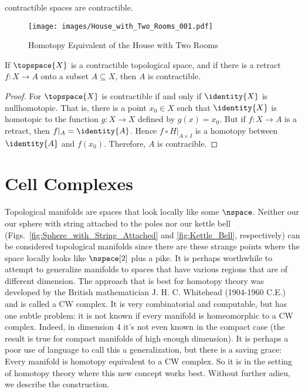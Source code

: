\documentclass{book}                                                           %
\begin{document}
                contractible spaces are contractible.
                \begin{figure}
                    \centering
                    \captionsetup{type=figure}
                    \texttt{[image: images/House\_with\_Two\_Rooms\_001.pdf]}
                    \caption{Homotopy Equivalent of the House with Two Rooms}
                    \label{fig:House_with_Two_Rooms_001}
                \end{figure}
                \begin{theorem}
                    If $\topspace{X}$ is a contractible topological space, and
                    if there is a retract $f:X\rightarrow{A}$ onto a subset
                    $A\subseteq{X}$, then $A$ is contractible.
                \end{theorem}
                \begin{proof}
                    For $\topspace{X}$ is contractible if and only if
                    $\identity{X}$ is nullhomotopic. That is, there is a point
                    $x_{0}\in{X}$ such that $\identity{X}$ is homotopic to the
                    function $g:X\rightarrow{X}$ defined by $g(x)=x_{0}$. But if
                    $f:X\rightarrow{A}$ is a retract, then
                    $f|_{A}=\identity{A}$. Hence $f\circ{H}|_{A\times{I}}$ is a
                    homotopy between $\identity{A}$ and $f(x_{0})$. Therefore,
                    $A$ is contracible.
                \end{proof}
        \section{Cell Complexes}
            Topological manifolds are spaces that look locally like some
            $\nspace$. Neither our our sphere with string attached to the poles
            nor our kettle bell (Figs.~\ref{fig:Sphere_with_String_Attached} and
            \ref{fig:Kettle_Bell}, respectively) can be considered topological
            manifolds since there are these strange points where the space
            locally looks like $\nspace[2]$ plus a pike. It is perhaps
            worthwhile to attempt to generalize manifolds to spaces that have
            various regions that are of different dimension. The approach that
            is best for homotopy theory was developed by the British
            mathematician J. H. C. Whitehead (1904-1960 C.E.) and is called a
            CW complex. It is very combinatorial and computable, but has one
            subtle problem: it is not known if every manifold is homeomorphic to
            a CW complex. Indeed, in dimension 4 it's not even known in the
            compact case (the result is true for compact manifolds of high
            enough dimension). It is perhaps a poor use of language to call this
            a generalization, but there is a saving grace: Every manifold is
            homotopy equivalent to a CW complex. So it is in the setting of
            homotopy theory where this new concept works best. Without further
            adieu, we describe the construction.
            \par\hfill\par

    \clearpage
    
    

    \clearpage
    \printindex
\end{document}
